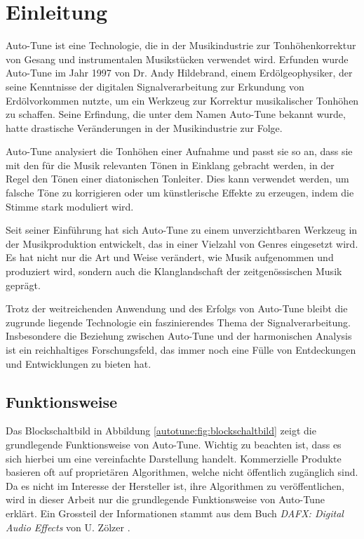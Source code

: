 %
%
%
%
\section{Einleitung\label{autotune:section:teil0}}
Auto-Tune ist eine Technologie, die in der Musikindustrie zur Tonhöhenkorrektur von Gesang und instrumentalen Musikstücken verwendet wird.
Erfunden wurde Auto-Tune im Jahr 1997 von Dr. Andy Hildebrand, einem Erdölgeophysiker,
der seine Kenntnisse der digitalen Signalverarbeitung zur Erkundung von Erdölvorkommen nutzte,
um ein Werkzeug zur Korrektur musikalischer Tonhöhen zu schaffen.
Seine Erfindung, die unter dem Namen Auto-Tune bekannt wurde, hatte drastische Veränderungen in der Musikindustrie zur Folge.

Auto-Tune analysiert die Tonhöhen einer Aufnahme und passt sie so an, dass sie mit den für die Musik relevanten Tönen in Einklang gebracht werden,
in der Regel den Tönen einer diatonischen Tonleiter.
Dies kann verwendet werden, um falsche Töne zu korrigieren oder um künstlerische Effekte zu erzeugen, indem die Stimme stark moduliert wird.

Seit seiner Einführung hat sich Auto-Tune zu einem unverzichtbaren Werkzeug in der Musikproduktion entwickelt,
das in einer Vielzahl von Genres eingesetzt wird.
Es hat nicht nur die Art und Weise verändert, wie Musik aufgenommen und produziert wird,
sondern auch die Klanglandschaft der zeitgenössischen Musik geprägt.

Trotz der weitreichenden Anwendung und des Erfolgs von Auto-Tune bleibt die zugrunde liegende Technologie ein faszinierendes Thema der Signalverarbeitung.
Insbesondere die Beziehung zwischen Auto-Tune und der harmonischen Analysis ist ein reichhaltiges Forschungsfeld,
das immer noch eine Fülle von Entdeckungen und Entwicklungen zu bieten hat.


\subsection{Funktionsweise
\label{autotune:subsection:funktionsweise}}
Das Blockschaltbild in Abbildung \ref{autotune:fig:blockschaltbild} zeigt die grundlegende Funktionsweise von Auto-Tune.
Wichtig zu beachten ist, dass es sich hierbei um eine vereinfachte Darstellung handelt.
Kommerzielle Produkte basieren oft auf proprietären Algorithmen, welche nicht öffentlich zugänglich sind.
Da es nicht im Interesse der Hersteller ist, ihre Algorithmen zu veröffentlichen,
wird in dieser Arbeit nur die grundlegende Funktionsweise von Auto-Tune erklärt.
Ein Grossteil der Informationen stammt aus dem Buch \emph{DAFX: Digital Audio Effects} von U. Zölzer \cite{autotune:digitalAudioEffects}.

